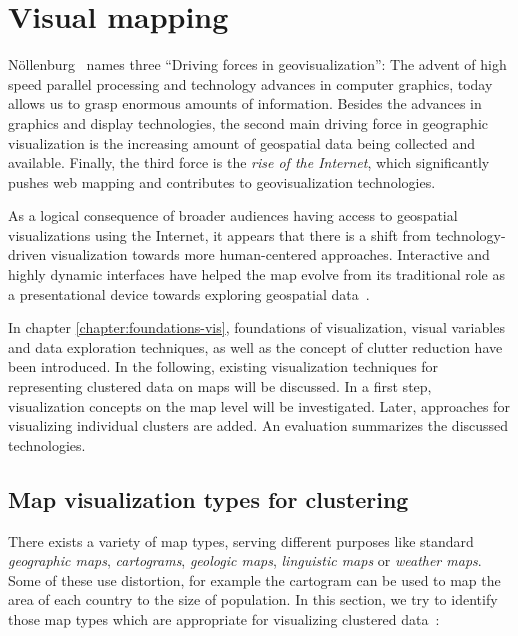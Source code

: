 
%
%

\section{Visual mapping}
\label{state-vis}

N\"{o}llenburg~\cite{noellenburg11geovis} names three ``Driving forces in geovisualization'': The advent of high speed parallel processing and technology advances in computer graphics, today allows us to grasp enormous amounts of information. Besides the advances in graphics and display technologies, the second main driving force in geographic visualization is the increasing amount of geospatial data being collected and available. Finally, the third force is the \textit{rise of the Internet}, which significantly pushes web mapping and contributes to geovisualization technologies.

As a logical consequence of broader audiences having access to geospatial visualizations using the Internet, it appears that there is a shift from technology-driven visualization towards more human-centered approaches. Interactive and highly dynamic interfaces have helped the map evolve from its traditional role as a presentational device towards exploring geospatial data~\cite{noellenburg11geovis, vislecture}.

In chapter \ref{chapter:foundations-vis}, foundations of visualization, visual variables and data exploration techniques, as well as the concept of clutter reduction have been introduced. In the following, existing visualization techniques for representing clustered data on maps will be discussed. In a first step, visualization concepts on the map level will be investigated. Later, approaches for visualizing individual clusters are added. An evaluation summarizes the discussed technologies. 

\subsection{Map visualization types for clustering}
\label{chapter:map-vis}

There exists a variety of map types, serving different purposes like standard \textit{geographic maps}, \textit{cartograms}, \textit{geologic maps}, \textit{linguistic maps} or \textit{weather maps}. Some of these use distortion, for example the cartogram can be used to map the area of each country to the size of population. In this section, we try to identify those map types which are appropriate for visualizing clustered data~\cite{noellenburg11geovis, wiki:map-types}:


